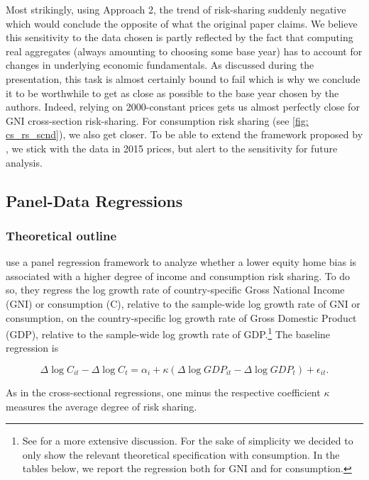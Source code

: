 \documentclass[11pt,a4paper]{article}
\begin{document}
Most strikingly, using Approach 2, the trend of risk-sharing suddenly negative which would conclude the opposite of what the original paper claims.
We believe this sensitivity to the data chosen is partly reflected by the fact that computing real aggregates (always amounting to choosing some base year) has to account for changes in underlying economic fundamentals. As discussed during the presentation, this task is almost certainly bound to fail which is
why we conclude it to be worthwhile to get as close as possible to the base year chosen by the authors. Indeed, relying on 2000-constant prices gets us almost
perfectly close for GNI cross-section risk-sharing. For consumption risk sharing (see \ref{fig: cs_rs_scnd}), we also get closer. To be able to extend the framework proposed by \textcite{main}, we stick with the data in 2015 prices, but alert to the sensitivity for future analysis.

\subsection{Panel-Data Regressions}\label{subsec:replication_panel}

\subsubsection{Theoretical outline}

\textcite{main} use a panel regression framework to analyze whether a lower equity home bias is associated with a higher degree of income and consumption risk sharing. To do so, they regress the log growth rate of
country-specific Gross National Income (GNI) or consumption (C), relative to the
sample-wide log growth rate of GNI or consumption, on the country-specific log growth
rate of Gross Domestic Product (GDP), relative to the sample-wide log growth rate of
GDP.\footnote{See \textcite{main} for a more extensive discussion. For the sake of simplicity we decided to only show the relevant theoretical specification with consumption. In the tables below, we report the regression both for GNI and for consumption.} The baseline regression is

\begin{equation}
\Delta \log C_{it} - \Delta \log C_t
=
\alpha_i
+
\kappa
\left(
\Delta \log GDP_{it} - \Delta \log GDP_t
\right)
+
\epsilon_{it}.
\end{equation}

As in the cross-sectional regressions, one minus the respective coefficient
\(\kappa\) measures the average degree of risk sharing.
\end{document}
